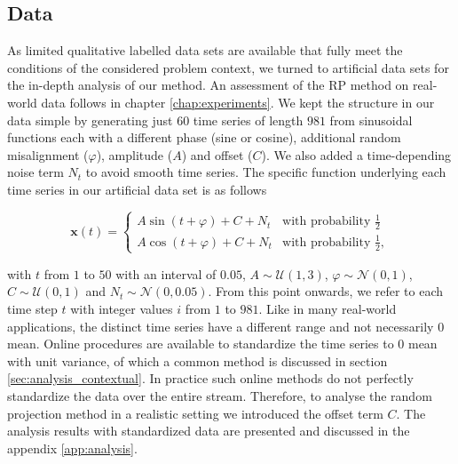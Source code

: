 \subsection{Data}

As limited qualitative labelled data sets are available that fully meet the conditions of the considered problem context, we turned to artificial data sets for the in-depth analysis of our method. An assessment of the RP method on real-world data follows in chapter \ref{chap:experiments}.
We kept the structure in our data simple by generating just $60$ time series of length $981$ from sinusoidal functions each with a different phase (sine or cosine), additional random misalignment ($\varphi$), amplitude ($A$) and offset ($C$). We also added a time-depending noise term $N_t$ to avoid smooth time series. The specific function underlying each time series in our artificial data set is as follows

\begin{equation}\label{eq:analysis_data}
 \mathbf{x}(t) = 
	\begin{cases} 
		A \sin(t + \varphi) + C + N_t	& \text{with probability } \frac{1}{2} \\[0.5em]
		A \cos(t + \varphi) + C + N_t   & \text{with probability } \frac{1}{2},
	\end{cases}
\end{equation}
\vspace{0.2cm}

\noindent with $t$ from $1$ to $50$ with an interval of $0.05$, $A \sim \mathcal{U}(1,3)$, $\varphi \sim \mathcal{N}(0,1)$, $C \sim \mathcal{U}(0,1)$ and $N_t \sim \mathcal{N}(0,0.05)$. From this point onwards, we refer to each time step $t$ with integer values $i$ from $1$ to $981$. Like in many real-world applications, the distinct time series have a different range and not necessarily $0$ mean. Online procedures are available to standardize the time series to $0$ mean with unit variance, of which a common method is discussed in section \ref{sec:analysis_contextual}. In practice such online methods do not perfectly standardize the data over the entire stream. Therefore, to analyse the random projection method in a realistic setting we introduced the offset term $C$. The analysis results with standardized data are presented and discussed in the appendix \ref{app:analysis}.

